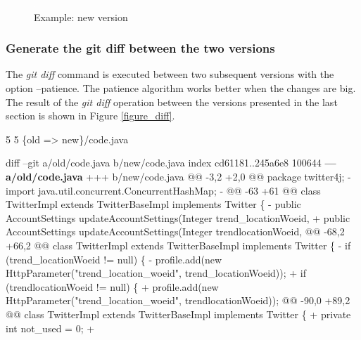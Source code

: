 \documentclass[
]{article}
\newenvironment{Shaded}{\begin{snugshade}}{\end{snugshade}}
\newcommand{\DataTypeTok}[1]{\textcolor[rgb]{0.13,0.29,0.53}{#1}}
\newcommand{\KeywordTok}[1]{\textcolor[rgb]{0.13,0.29,0.53}{\textbf{#1}}}
\newcommand{\NormalTok}[1]{#1}
\newcommand{\StringTok}[1]{\textcolor[rgb]{0.31,0.60,0.02}{#1}}
\newcommand{\VariableTok}[1]{\textcolor[rgb]{0.00,0.00,0.00}{#1}}
\begin{document}
\begin{landscape}
\normalsize

\begin{figure}
\centering
\includegraphics{figures/fake.png}
\caption{Example: new version\label{new_example}}
\end{figure}

\end{landscape}

\subsubsection{Generate the git diff between the two versions}\label{diff}

The \emph{git diff} command is executed between two subsequent versions
with the option --patience. The patience algorithm works better when the
changes are big. The result of the \emph{git diff} operation between the
versions presented in the last section is shown in Figure
\ref{figure_diff}.

\small

\begin{Shaded}
\begin{Highlighting}[]
\DataTypeTok{5   5   \{old => new\}/code.java}

\NormalTok{diff --git a/old/code.java b/new/code.java}
\NormalTok{index cd61181..245a6e8 100644}
\KeywordTok{--- a/old/code.java}
\DataTypeTok{+++ b/new/code.java}
\DataTypeTok{@@ -3,2 +2,0 @@ package twitter4j;}
\StringTok{-import java.util.concurrent.ConcurrentHashMap;}
\StringTok{-}
\DataTypeTok{@@ -63 +61 @@ class TwitterImpl extends TwitterBaseImpl implements Twitter \{}
\StringTok{-    public AccountSettings updateAccountSettings(Integer trend_locationWoeid,}
\VariableTok{+    public AccountSettings updateAccountSettings(Integer trendlocationWoeid,}
\DataTypeTok{@@ -68,2 +66,2 @@ class TwitterImpl extends TwitterBaseImpl implements Twitter \{}
\StringTok{-        if (trend_locationWoeid != null) \{}
\StringTok{-            profile.add(new HttpParameter("trend_location_woeid", trend_locationWoeid));}
\VariableTok{+        if (trendlocationWoeid != null) \{}
\VariableTok{+            profile.add(new HttpParameter("trend_location_woeid", trendlocationWoeid));}
\DataTypeTok{@@ -90,0 +89,2 @@ class TwitterImpl extends TwitterBaseImpl implements Twitter \{}
\VariableTok{+    private int not_used = 0;}
\VariableTok{+}
\end{Highlighting}
\end{Shaded}
\end{document}
